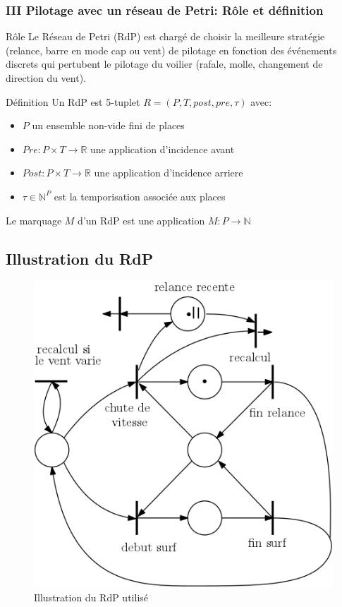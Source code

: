 \documentclass{beamer}
\begin{document}
\begin{frame}\frametitle{III Pilotage avec un  réseau de Petri: Rôle et définition}
\begin{block}{Rôle}
Le Réseau de Petri (RdP) est chargé de choisir la meilleure stratégie (relance, barre en mode cap ou vent) de pilotage en fonction des événements discrets qui pertubent le pilotage du voilier (rafale, molle, changement de direction du vent).
\end{block}
\begin{block}{Définition}
Un RdP est 5-tuplet $ R = (P, T, post, pre, \tau) $ avec:
\begin{itemize}
\item $P$ un ensemble non-vide fini de places
\item $Pre : P \times T \rightarrow \mathbb{R}$ une application d'incidence avant
\item $Post : P \times T \rightarrow \mathbb{R}$ une application d'incidence arriere
\item $\tau \in \mathbb{N}^{P}$ est la temporisation associée aux places
\end{itemize}
Le marquage $M$ d'un RdP est une application $M : P \rightarrow \mathbb{N}$
\end{block}
\end{frame}

\subsection{Illustration du RdP}

\begin{frame}[plain]
\begin{figure}
\includegraphics[scale=0.5]{rdp2.png} 
\caption{Illustration du RdP utilisé}
\end{figure}
\end{frame}
\end{document}
